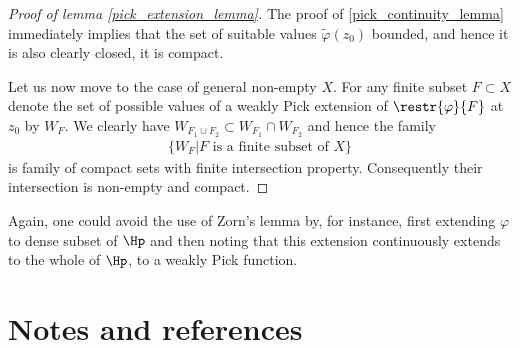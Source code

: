 \begin{proof}[Proof of lemma \ref{pick_extension_lemma}]
	The proof of \ref{pick_continuity_lemma} immediately implies that the set of suitable values $\tilde{\varphi}(z_{0})$ bounded, and hence it is also clearly closed, it is compact.

	Let us now move to the case of general non-empty $X$. For any finite subset $F \subset X$ denote the set of possible values of a weakly Pick extension of $\restr{\varphi}{F}$ at $z_{0}$ by $W_{F}$. We clearly have $W_{F_{1} \cup F_{2}} \subset W_{F_{1}} \cap W_{F_{2}}$ and hence the family
	\begin{align*}
		\{ W_{F} | \text{$F$ is a finite subset of $X$}\}
	\end{align*}
	is family of compact sets with finite intersection property. Consequently their intersection is non-empty and compact.
\end{proof}

Again, one could avoid the use of Zorn's lemma by, for instance, first extending $\varphi$ to dense subset of $\Hp$ and then noting that this extension continuously extends to the whole of $\Hp$, to a weakly Pick function.


\section{Notes and references}

\begin{comment}

TODO:
\begin{itemize}
	\item Examples of representing measures behind functions and functions behind representing measures
	\item Spectral commutant lifting theorem
	\item Use Morera's theorem to prove weak Hindmarsh's theorem
	\item Nice formula for finite Pick extension (rational function case)
\end{itemize}

\end{comment}






